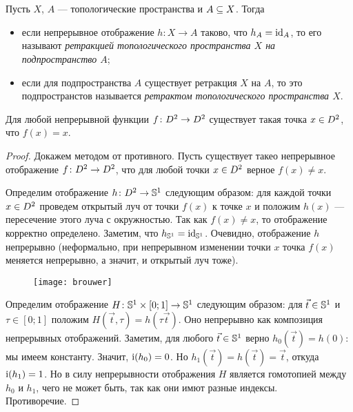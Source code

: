 \documentclass[main]{subfiles}
\begin{document}

\section{}

\begin{definition}
	Пусть $ X $, $ A $ --- топологические пространства и $ A \ssq X $. Тогда
	\begin{itemize}
		\item если непрерывное отображение $ h \colon X \to A $ таково, что $ h_A = \Id_A $,
			то его называют \emph{ретракцией топологического пространства $ X $ на подпространство $ A $};
		\item если для подпространства $ A $ существует ретракция $ X $ на $ A $, то это подпространстов называется
			\emph{ретрактом топологического пространства $ X $}.
	\end{itemize}
\end{definition}

\begin{theorem}[Бр\'{а}уэра]
	Для любой непрерывной функции $ f \colon \D^2 \to \D^2 $ существует такая точка $ x \in \D^2 $, что $ f(x) = x $.
\end{theorem}

\begin{proof}
	Докажем методом от противного. Пусть существует такео непрерывное отображение $ f \colon \D^2 \to \D^2 $,
	что для любой точки $ x \in \D^2 $ верное $ f(x) \neq x $.

	Определим отображение $ h  \colon \D^2 \to \S^1 $ следующим образом: для каждой точки $ x \in \D^2 $ проведем
	открытый луч от точки $ f(x) $ к точке $ x $ и положим $ h(x) $ --- пересечение этого луча с окружностью.
	Так как $ f(x) \neq x $, то отображение корректно определено. Заметим, что $ h_{\S^1} = \Id_{\S^1} $.
	Очевидно, отображение $ h $ непрерывно (неформально, при непрерывном изменении точки $ x $ точка $ f(x) $
	меняется непрерывно, а значит, и открытый луч тоже).

	\begin{figure}[H]
		\centering \texttt{[image: brouwer]}
	\end{figure}

	Определим отображение $ H \colon \S^1 \times [0;1] \to \S^1 $ следующим образом: для $ \vec{t} \in \S^1 $ и
	$ \tau \in [0;1] $ положим $ H(\vec{t}, \tau) = h(\tau \vec{t}) $. Оно непрерывно как композиция непрерывных
	отображений. Заметим, для любого $ \vec{t} \in \S^1 $ верно $ h_0(\vec{t}) = h(0) $:
	мы имеем константу. Значит, $ \Ind(h_0) = 0 $. Но $ h_1(\vec{t}) = h(\vec{t}) = \vec{t} $, откуда
	$ \Ind(h_1) = 1 $. Но в силу непрерывности отображения $ H $ является гомотопией между $ h_0 $ и $ h_1 $, чего
	не может быть, так как они имют разные индексы. Противоречие.
\end{proof}
\end{document}
